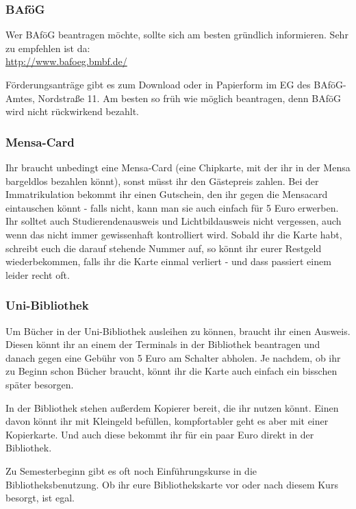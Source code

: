 \begin{multicols}{2}
\subsubsection{BAföG}
	\label{todobafoeg}

	Wer BAföG beantragen möchte, sollte sich am besten gründlich informieren. Sehr zu empfehlen ist da: \\
	\url{http://www.bafoeg.bmbf.de/}
 
	Förderungsanträge gibt es zum Download oder in Papierform im
	EG des BAföG-Amtes, Nordstraße 11. Am besten so früh
	wie möglich beantragen, denn BAföG wird nicht rückwirkend
	bezahlt.

\subsubsection{Mensa-Card}
	\label{todomensa}

Ihr braucht unbedingt eine Mensa-Card (eine Chipkarte, mit der ihr in der Mensa bargeldlos bezahlen könnt), sonst müsst ihr den Gästepreis zahlen. Bei der Immatrikulation bekommt ihr einen Gutschein, den ihr gegen die Mensacard eintauschen könnt - falls nicht, kann man sie auch einfach für 5 Euro erwerben. Ihr solltet auch Studierendenausweis und Lichtbildausweis nicht vergessen, auch wenn das nicht immer gewissenhaft kontrolliert wird. Sobald ihr die Karte habt, schreibt euch die darauf stehende Nummer auf, so könnt ihr eurer Restgeld wiederbekommen, falls ihr die Karte einmal verliert - und dass passiert einem leider recht oft.

\subsubsection{Uni-Bibliothek}
	\label{todobib}

	Um Bücher in der Uni-Bibliothek ausleihen zu können, braucht ihr einen Ausweis. Diesen könnt ihr an einem der Terminals in der Bibliothek beantragen und danach gegen eine Gebühr von 5 Euro am Schalter abholen. Je nachdem, ob ihr zu Beginn schon Bücher braucht, könnt ihr die Karte auch einfach ein bisschen später besorgen.

	In der Bibliothek stehen außerdem Kopierer bereit, die ihr nutzen könnt. Einen davon könnt ihr mit Kleingeld befüllen, kompfortabler geht es aber mit einer Kopierkarte. Und auch diese bekommt ihr für ein paar Euro direkt in der Bibliothek.

	Zu Semesterbeginn gibt es oft noch Einführungskurse in die Bibliotheksbenutzung. Ob ihr eure Bibliothekskarte vor oder nach diesem Kurs besorgt, ist egal.


\end{multicols}
